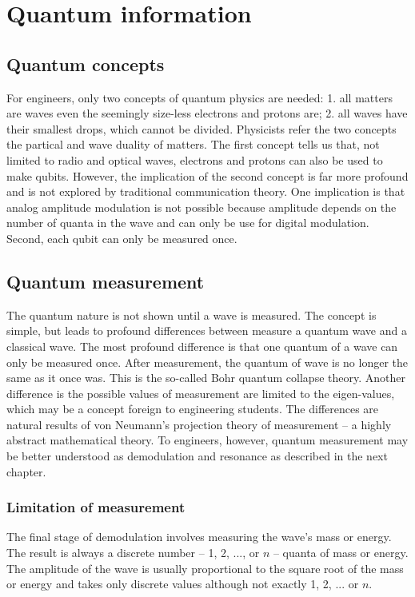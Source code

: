 \documentclass[Letter,11pt]{book}
\begin{document}
\chapter{Quantum information}\label{C-qi}
\section{Quantum concepts}
For engineers, only two concepts of quantum physics are needed: 1. all matters are waves even the seemingly size-less electrons and protons are; 2. all waves have their smallest drops, which cannot be divided. Physicists refer the two concepts the partical and wave duality of matters. The first concept tells us that, not limited to radio and optical waves, electrons and protons can also be used to make qubits. However, the implication of the second concept is far more profound and is not explored by traditional communication theory. One implication is that analog amplitude modulation is not possible because amplitude depends on the number of quanta in the wave and can only be use for digital modulation. Second, each qubit can only be measured once.

\section{Quantum measurement}
The quantum nature is not shown until a wave is measured. The concept is simple, but leads to profound differences between measure a quantum wave and a classical wave. The most profound difference is that one quantum of a wave can only be measured once. After measurement, the quantum of wave is no longer the same as it once was. This is the so-called Bohr quantum collapse theory. Another difference is the possible values of measurement are limited to the eigen-values, which may be a concept foreign to engineering students. The differences are natural results of von Neumann's projection theory of measurement -- a highly abstract mathematical theory. To engineers, however, quantum measurement may be better understood as demodulation and resonance as described in the next chapter. 

\subsection{Limitation of measurement}
The final stage of demodulation involves measuring the wave's mass or energy. The result is always a discrete number -- 1, 2, ..., or $n$ -- quanta of mass or energy. The amplitude of the wave is usually proportional to the square root of the mass or energy and takes only discrete values although not exactly 1, 2, ... or $n$.
\end{document}
